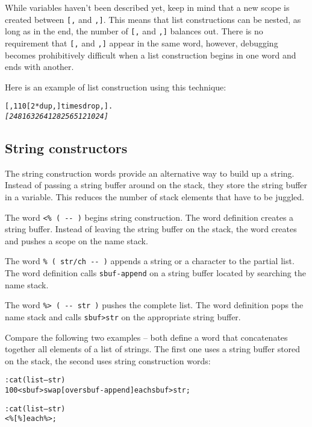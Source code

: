 \documentclass[english]{article}
\begin{document}
While variables haven't been described yet, keep in mind that a new
scope is created between \texttt{{[},} and \texttt{,{]}}. This means
that list constructions can be nested, as long as in the end, the
number of \texttt{{[},} and \texttt{,{]}} balances out. There is no
requirement that \texttt{{[},} and \texttt{,{]}} appear in the same
word, however, debugging becomes prohibitively difficult when a list
construction begins in one word and ends with another.

Here is an example of list construction using this technique:

\begin{alltt}
{[}, 1 10 {[} 2 {*} dup , {]} times drop ,{]} .
\emph{{[} 2 4 8 16 32 64 128 256 512 1024 {]}}
\end{alltt}

\subsection{String constructors}

The string construction words provide an alternative way to build up a string. Instead of passing a string buffer around on the stack, they store the string buffer in a variable. This reduces the number
of stack elements that have to be juggled.

The word \texttt{<\% ( -{}- )} begins string construction. The word
definition creates a string buffer. Instead of leaving the string
buffer on the stack, the word creates and pushes a scope on the name
stack.

The word \texttt{\% ( str/ch -{}- )} appends a string or a character
to the partial list. The word definition calls \texttt{sbuf-append}
on a string buffer located by searching the name stack.

The word \texttt{\%> ( -{}- str )} pushes the complete list. The word
definition pops the name stack and calls \texttt{sbuf>str} on the
appropriate string buffer.

Compare the following two examples -- both define a word that concatenates together all elements of a list of strings. The first one uses a string buffer stored on the stack, the second uses string construction words:

\begin{alltt}
: cat ( list -- str )
    100 <sbuf> swap {[} over sbuf-append {]} each sbuf>str ;

: cat ( list -- str )
    <\% {[} \% {]} each \%> ;
\end{alltt}
\end{document}

